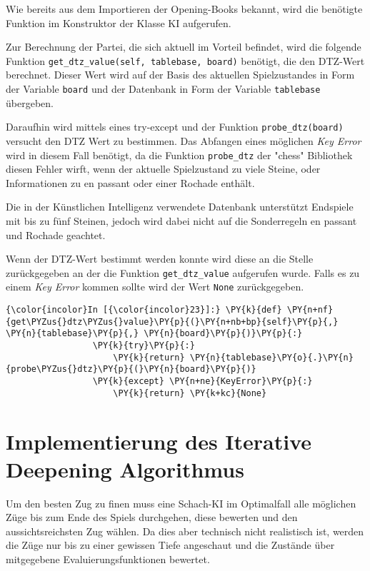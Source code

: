    Wie bereits aus dem Importieren der Opening-Books bekannt, wird die
benötigte Funktion im Konstruktor der Klasse KI aufgerufen.

    Zur Berechnung der Partei, die sich aktuell im Vorteil befindet, wird die
folgende Funktion \texttt{get\_dtz\_value(self,\ tablebase,\ board)}
benötigt, die den DTZ-Wert berechnet. Dieser Wert wird auf der Basis des
aktuellen Spielzustandes in Form der Variable \texttt{board} und der
Datenbank in Form der Variable \texttt{tablebase} übergeben.

Daraufhin wird mittels eines try-except und der Funktion
\texttt{probe\_dtz(board)} versucht den DTZ Wert zu bestimmen. Das
Abfangen eines möglichen \emph{Key Error} wird in diesem Fall benötigt,
da die Funktion \texttt{probe\_dtz} der "chess" Bibliothek diesen Fehler
wirft, wenn der aktuelle Spielzustand zu viele Steine, oder
Informationen zu en passant oder einer Rochade enthält.

Die in der Künstlichen Intelligenz verwendete Datenbank unterstützt
Endspiele mit bis zu fünf Steinen, jedoch wird dabei nicht auf die
Sonderregeln en passant und Rochade geachtet.

Wenn der DTZ-Wert bestimmt werden konnte wird diese an die Stelle
zurückgegeben an der die Funktion \texttt{get\_dtz\_value} aufgerufen
wurde. Falls es zu einem \emph{Key Error} kommen sollte wird der Wert
\texttt{None} zurückgegeben.

    \begin{Verbatim}[commandchars=\\\{\}]
{\color{incolor}In [{\color{incolor}23}]:} \PY{k}{def} \PY{n+nf}{get\PYZus{}dtz\PYZus{}value}\PY{p}{(}\PY{n+nb+bp}{self}\PY{p}{,} \PY{n}{tablebase}\PY{p}{,} \PY{n}{board}\PY{p}{)}\PY{p}{:}
                 \PY{k}{try}\PY{p}{:}
                     \PY{k}{return} \PY{n}{tablebase}\PY{o}{.}\PY{n}{probe\PYZus{}dtz}\PY{p}{(}\PY{n}{board}\PY{p}{)}
                 \PY{k}{except} \PY{n+ne}{KeyError}\PY{p}{:}
                     \PY{k}{return} \PY{k+kc}{None}
\end{Verbatim}

    \section{Implementierung des Iterative Deepening
Algorithmus}\label{implementierung-des-iterative-deepening-algorithmus}

Um den besten Zug zu finen muss eine Schach-KI im Optimalfall alle
möglichen Züge bis zum Ende des Spiels durchgehen, diese bewerten und
den aussichtsreichsten Zug wählen. Da dies aber technisch nicht
realistisch ist, werden die Züge nur
bis zu einer gewissen Tiefe angeschaut und die Zustände über mitgegebene
Evaluierungsfunktionen bewertet.

